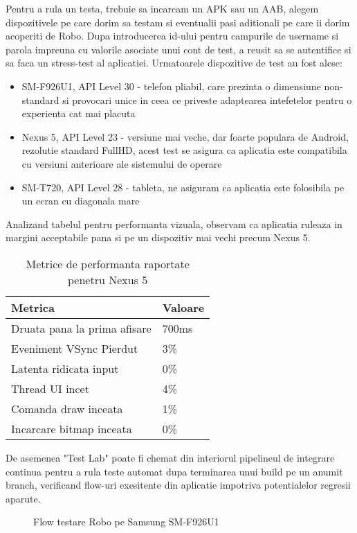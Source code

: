 Pentru a rula un testa, trebuie sa incarcam un APK sau un AAB, alegem dispozitivele pe care dorim sa testam si eventualii pasi aditionali pe care ii dorim acoperiti de Robo. Dupa introducerea id-ului pentru campurile de username si parola impreuna cu valorile asociate unui cont de test, a reusit sa se autentifice si sa faca un stress-test al aplicatiei. Urmatoarele dispozitive de test au fost alese:

\begin{itemize}
  \item SM-F926U1, API Level 30 - telefon pliabil, care prezinta o dimensiune non-standard si provocari unice in ceea ce priveste adaptearea intefetelor pentru o experienta cat mai placuta
  \item Nexus 5, API Level 23 - versiune mai veche, dar foarte populara de Android, rezolutie standard FullHD, acest test se asigura ca aplicatia este compatibila cu versiuni anterioare ale sistemului de operare
  \item SM-T720, API Level 28 - tableta, ne asiguram ca aplicatia este folosibila pe un ecran cu diagonala mare
\end{itemize}

Analizand tabelul pentru performanta vizuala, observam ca aplicatia ruleaza in margini acceptabile pana si pe un dispozitiv mai vechi precum Nexus 5.

\begin{table}[ht!]
\begin{tabular}{ll}
\hline
Metrica &  Valoare \\ 
\hline
\hline
Druata pana la prima afisare & 700ms \\
Eveniment VSync Pierdut & 3\% \\
Latenta ridicata input & 0\% \\
Thread UI incet & 4\% \\
Comanda draw inceata & 1\% \\
Incarcare bitmap inceata & 0\% \\
\hline
\end{tabular}
\centering
\caption{Metrice de performanta raportate penetru Nexus 5}
\label{tab:metrics}
\end{table}

De asemenea "Test Lab" poate fi chemat din interiorul pipelineul de integrare continua pentru a rula teste automat dupa terminarea unui build pe un anumit branch, verificand flow-uri exesitente din aplicatie impotriva potentialelor regresii aparute.

\begin{figure}[h!]
  \centering
  \caption{Flow testare Robo pe Samsung SM-F926U1}
\end{figure}